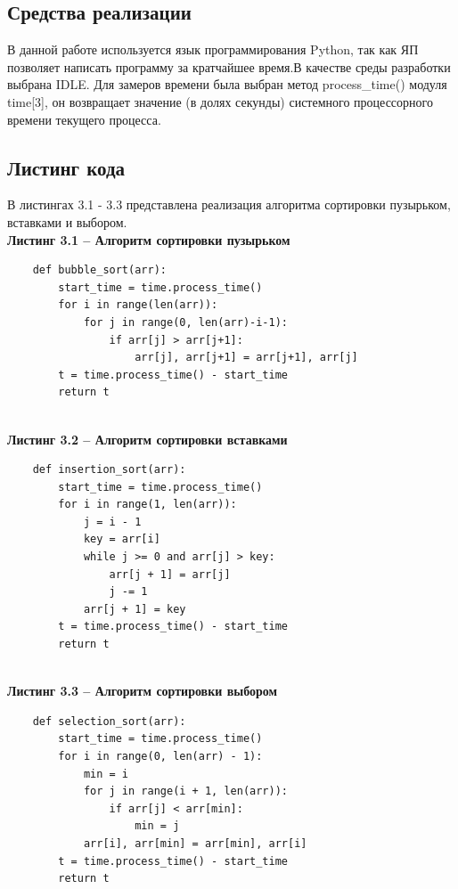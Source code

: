 \documentclass[a4paper,12pt]{article}
\begin{document}
	\subsection{Средства реализации}
	\hfill
	
	В данной работе используется язык программирования Python, так как ЯП позволяет написать программу за кратчайшее время.В качестве среды разработки выбрана IDLE. Для замеров времени была выбран метод process\_time() модуля time[3], он возвращает значение (в долях секунды) системного процессорного времени текущего процесса.
	
	\subsection{Листинг кода}
	\hfill
	В листингах 3.1 - 3.3 представлена реализация алгоритма сортировки пузырьком,  вставками и выбором.
	\lstset{ %
		language=Python,                %
		numbers=left,                   %
	}
	\textbf{\\Листинг 3.1 -- Алгоритм сортировки пузырьком}
	
	\begin{lstlisting}
	def bubble_sort(arr):
		start_time = time.process_time()
		for i in range(len(arr)):
			for j in range(0, len(arr)-i-1):
				if arr[j] > arr[j+1]:
					arr[j], arr[j+1] = arr[j+1], arr[j]
		t = time.process_time() - start_time
		return t	
	\end{lstlisting}
	\textbf{\\Листинг 3.2 -- Алгоритм сортировки вставками }
	
	\begin{lstlisting}
	def insertion_sort(arr):
		start_time = time.process_time()
		for i in range(1, len(arr)):
			j = i - 1
			key = arr[i]	
			while j >= 0 and arr[j] > key:
				arr[j + 1] = arr[j]
				j -= 1
			arr[j + 1] = key
		t = time.process_time() - start_time
		return t
	\end{lstlisting}
	
	\textbf{\\Листинг 3.3 -- Алгоритм сортировки выбором}
	
	\begin{lstlisting}
	def selection_sort(arr):
		start_time = time.process_time()
		for i in range(0, len(arr) - 1):
			min = i
			for j in range(i + 1, len(arr)):
				if arr[j] < arr[min]:
					min = j
			arr[i], arr[min] = arr[min], arr[i]
		t = time.process_time() - start_time
		return t
	\end{lstlisting}
	
\end{document}

